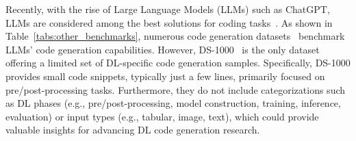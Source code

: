 Recently, with the rise of Large Language Models (LLMs) such as ChatGPT, LLMs are considered among the best solutions for coding tasks~\cite{wang2021codet5, feng2020codebert, achiam2023gpt}.
As shown in Table~\ref{tabs:other_benchmarks}, numerous code generation datasets~\cite{hendrycks2measuring,austin2021program,agashe-etal-2019-juice, lu2021codexglue, yu2018spider,du2024evaluating, zhuo2024bigcodebench} benchmark LLMs' code generation capabilities.
However, DS-1000~\cite{lai2023ds} is the only dataset offering a limited set of DL-specific code generation samples. Specifically, DS-1000 provides small code snippets, typically just a few lines, primarily focused on pre/post-processing tasks. Furthermore, they do not include categorizations such as DL phases (e.g., pre/post-processing, model construction, training, inference, evaluation) or input types (e.g., tabular, image, text), which could provide valuable insights for advancing DL code generation research.



